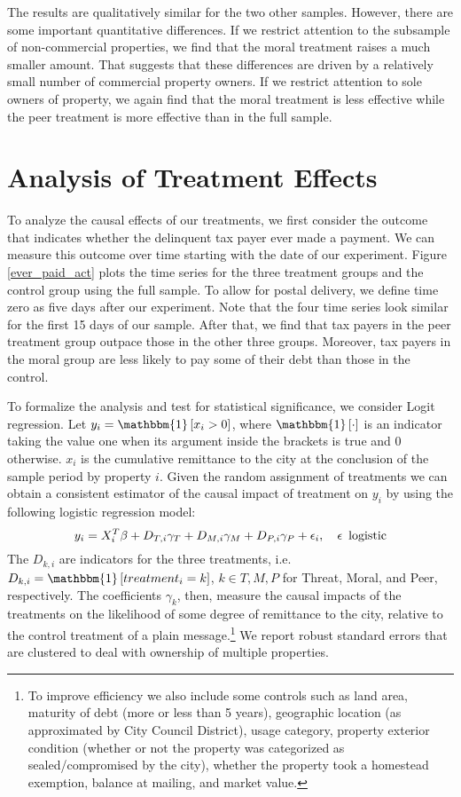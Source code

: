 \documentclass[12pt,titlepage]{article}
\begin{document}
The results are qualitatively similar for the two other
samples. However, there are some important quantitative
differences. If we restrict attention to the subsample of
non-commercial properties, we find that the moral treatment raises a
much smaller amount. That suggests that these differences are driven
by a relatively small number of commercial property owners.  If we
restrict attention to sole owners of property, we again find that the
moral treatment is less effective while the peer treatment is more
effective than in the full sample.



\section{Analysis of Treatment Effects}

To analyze the causal effects of our treatments, we first consider the
outcome that indicates whether the delinquent tax payer ever made a
payment.  We can measure this outcome over time starting with the date
of our experiment. Figure \ref{ever_paid_act} plots the time series
for the three treatment groups and the control group using the full
sample. To allow for postal delivery, we define time zero as five days
after our experiment.  Note that the four time series look similar for
the first 15 days of our sample.  After that, we find that tax payers
in the peer treatment group outpace those in the other three
groups. Moreover, tax payers in the moral group are less likely to pay
some of their debt than those in the control.

To formalize the analysis and test for statistical significance, we
consider Logit regression. Let $y_{i}=\mathbbm{1}\left[x_i>0\right]$,
where $\mathbbm{1}\left[\cdot\right]$ is an indicator taking the value
one when its argument inside the brackets is true and 0
otherwise. $x_i$ is the cumulative remittance to the city at the
conclusion of the sample period by property $i$. Given the random
assignment of treatments we can obtain a consistent estimator of the
causal impact of treatment on $y_i$ by using the following logistic
regression model:
\begin{equation}
y_{i}=X_i^T\beta +D_{T,i}\gamma_{T}+D_{M,i}\gamma_{M}+D_{P,i}\gamma_{P}
+\epsilon_{i},\hspace{1em}\epsilon \enskip\mbox{logistic}
\end{equation}
The $D_{k,i}$ are indicators for the three treatments, i.e.
$D_{k,i}=\mathbbm{1}\left[treatment_i=k\right]$, $k\in{T,M,P}$ for
Threat, Moral, and Peer, respectively. The coefficients $\gamma_{k}$,
then, measure the causal impacts of the treatments on the likelihood
of some degree of remittance to the city, relative to the control
treatment of a plain message.\footnote{To improve efficiency we also
  include some controls such as land area, maturity of debt (more or
  less than 5 years), geographic location (as approximated by City
  Council District), usage category, property exterior condition
  (whether or not the property was categorized as sealed/compromised
  by the city), whether the property took a homestead exemption,
  balance at mailing, and market value.} We report robust standard
errors that are clustered to deal with ownership of multiple
properties.
  
\end{document}
